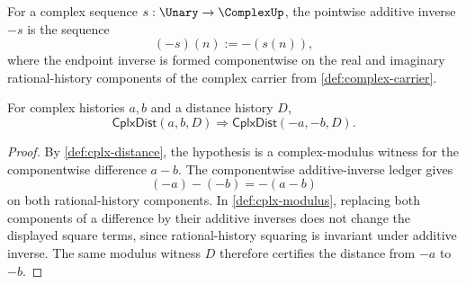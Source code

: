 \begin{definition}
\label{def:cplx-pointwise-negation}
For a complex sequence $s:\Unary\to\ComplexUp$, the pointwise additive inverse $-s$ is the sequence
$$
(-s)(n):=-(s(n)),
$$
where the endpoint inverse is formed componentwise on the real and imaginary rational-history components of the complex carrier from \autoref{def:complex-carrier}.
\end{definition}

\begin{lemma}
\label{lem:cplx-distance-simultaneous-negation}
For complex histories $a,b$ and a distance history $D$,
$$
\mathsf{CplxDist}(a,b,D)\Longrightarrow \mathsf{CplxDist}(-a,-b,D).
$$
\end{lemma}
\begin{proof}
By \autoref{def:cplx-distance}, the hypothesis is a complex-modulus witness for the componentwise difference $a-b$. The componentwise additive-inverse ledger gives
$$
(-a)-(-b)=-(a-b)
$$
on both rational-history components. In \autoref{def:cplx-modulus}, replacing both components of a difference by their additive inverses does not change the displayed square terms, since rational-history squaring is invariant under additive inverse. The same modulus witness $D$ therefore certifies the distance from $-a$ to $-b$.
\end{proof}

